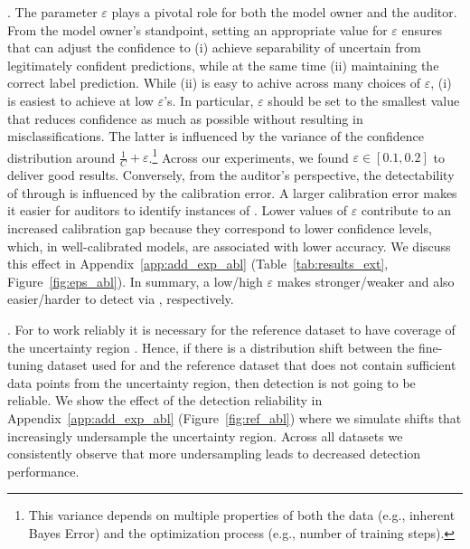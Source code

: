 . The parameter $\varepsilon$ plays a pivotal role for both the model owner and the auditor. From the model owner's standpoint, setting an appropriate value for $\varepsilon$ ensures that \attack can adjust the confidence to (i) achieve separability of uncertain from legitimately confident predictions, while at the same time (ii) maintaining the correct label prediction. While (ii) is easy to achive across many choices of $\varepsilon$, (i) is easiest to achieve at low $\varepsilon$'s. In particular, $\varepsilon$ should be set to the smallest value that reduces confidence as much as possible without resulting in misclassifications. The latter is influenced by the variance of the confidence distribution around $\frac{1}{C} + \varepsilon$.\footnote{This variance depends on multiple properties of both the data (e.g., inherent Bayes Error) and the optimization process (e.g., number of training steps).} Across our experiments, we found $\varepsilon \in [0.1,0.2]$ to deliver good results. Conversely, from the auditor's perspective, the detectability of \attack through \name is influenced by the calibration error. A larger calibration error makes it easier for auditors to identify instances of \attack. Lower values of $\varepsilon$ contribute to an increased calibration gap because they correspond to lower confidence levels, which, in well-calibrated models, are associated with lower accuracy. We discuss this effect in Appendix~\ref{app:add_exp_abl} (Table~\ref{tab:results_ext}, Figure~\ref{fig:eps_abl}). In summary, a low/high $\varepsilon$ makes \attack stronger/weaker and also easier/harder to detect via \name, respectively.


. For \name to work reliably it is necessary for the reference dataset to have coverage of the uncertainty region \uncertreg. Hence, if there is a distribution shift between the fine-tuning dataset used for \attack and the reference dataset that does not contain sufficient data points from the uncertainty region, then detection is not going to be reliable. We show the effect of the detection reliability in Appendix~\ref{app:add_exp_abl} (Figure~\ref{fig:ref_abl}) where we simulate shifts that increasingly undersample the uncertainty region. Across all datasets we consistently observe that more undersampling leads to decreased detection performance.

